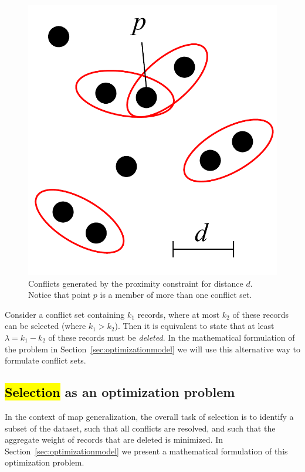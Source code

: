 \begin{figure}[htbp]
\begin{center}
\includegraphics[scale=.3]{figs/cvl_proximity_conflicts.pdf}
\caption{Conflicts generated by the proximity constraint for distance $d$. Notice that point $p$ is a member of more than one conflict set.}
\label{fig:proximity:conflict}
\end{center}
\end{figure}


Consider a conflict set containing $k_1$ records, where at most $k_2$ of these records can be selected (where $k_1 > k_2$). Then it is equivalent to state that at least $\lambda = k_1 - k_2$ of these records must be \emph{deleted}. In the mathematical formulation of the problem in Section~\ref{sec:optimizationmodel} we will use this alternative way to formulate conflict sets.

\subsection{\hl{Selection} as an optimization problem}
\label{sec:filtering}

In the context of map generalization, the overall task of selection is to identify a subset of the dataset, such that all conflicts are resolved, and such that the aggregate weight of records that are deleted is minimized. In Section~\ref{sec:optimizationmodel} we present a mathematical formulation of this optimization problem.

